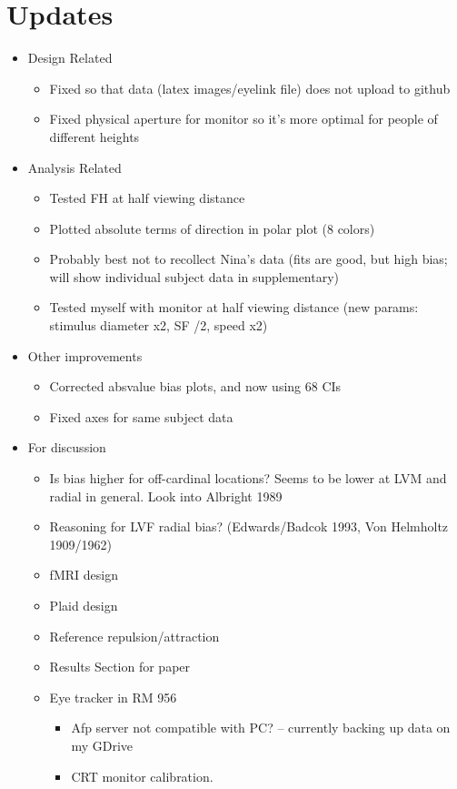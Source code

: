 \documentclass[11pt]{article} %
\begin{document}
\section{Updates} 
\begin{itemize}
\item Design Related
	\begin{itemize}
	\item Fixed so that data (latex images/eyelink file) does not upload to github
	\item Fixed physical aperture for monitor so it's more optimal for people of different heights
	\end{itemize}
\item Analysis Related
	\begin{itemize}
	\item Tested FH at half viewing distance
	\item Plotted absolute terms of direction in polar plot (8 colors)
	\item Probably best not to recollect Nina's data (fits are good, but high bias; will show individual subject data in supplementary)
	\item Tested myself with monitor at half viewing distance (new params: stimulus diameter x2, SF /2, speed x2)
	\end{itemize}
\item Other improvements
	\begin{itemize}
	\item Corrected absvalue bias plots, and now using 68 CIs
	\item Fixed axes for same subject data
	\end{itemize}
\item For discussion
	\begin{itemize}
	\item Is bias higher for off-cardinal locations? Seems to be lower at LVM and radial in general. Look into Albright 1989
	\item Reasoning for LVF radial bias? (Edwards/Badcok 1993, Von Helmholtz 1909/1962)
	\item fMRI design
	\item Plaid design
	\item Reference repulsion/attraction
	\item Results Section for paper
	\item Eye tracker in RM 956
		\begin{itemize}
			\item{Afp server not compatible with PC? -- currently backing up data on my GDrive}
			\item{CRT monitor calibration.}
		\end{itemize}
	\end{itemize}
\end{itemize}
\end{document}
